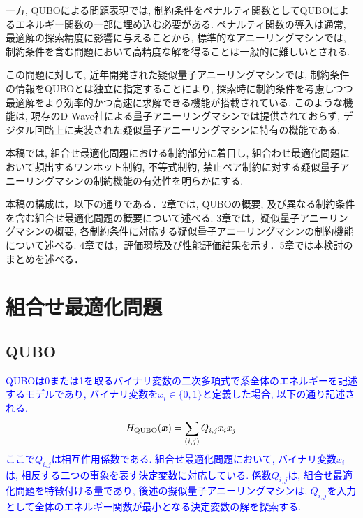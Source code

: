 \documentclass[submit,techrep,noauthor]{ipsj}
\begin{document}
一方, QUBOによる問題表現では, 制約条件をペナルティ関数としてQUBOによるエネルギー関数の一部に埋め込む必要がある. ペナルティ関数の導入は通常, 最適解の探索精度に影響に与えることから, 標準的なアニーリングマシンでは, 制約条件を含む問題において高精度な解を得ることは一般的に難しいとされる\cite{ozeki, onoda2}.

この問題に対して, 近年開発された疑似量子アニーリングマシンでは, 制約条件の情報をQUBOとは独立に指定することにより, 探索時に制約条件を考慮しつつ最適解をより効率的かつ高速に求解できる機能が搭載されている\cite{takano, da3}. このような機能は, 現存のD-Wave社による量子アニーリングマシンでは提供されておらず, デジタル回路上に実装された疑似量子アニーリングマシンに特有の機能である. 

本稿では, 組合せ最適化問題における制約部分に着目し, 組合わせ最適化問題において頻出するワンホット制約, 不等式制約, 禁止ペア制約に対する疑似量子アニーリングマシンの制約機能の有効性を明らかにする.

本稿の構成は，以下の通りである．2章では, QUBOの概要, 及び異なる制約条件を含む組合せ最適化問題の概要について述べる. 3章では，疑似量子アニーリングマシンの概要, 各制約条件に対応する疑似量子アニーリングマシンの制約機能について述べる. 4章では，評価環境及び性能評価結果を示す．5章では本検討のまとめを述べる．

\section{組合せ最適化問題}

\subsection{QUBO}
\textcolor{blue}{QUBOは0または1を取るバイナリ変数の二次多項式で系全体のエネルギーを記述するモデルであり, バイナリ変数を$x_{i}\in\{0, 1\}$と定義した場合, 以下の通り記述される.
\begin{equation}
H_{\rm{QUBO}}(\bm{x}) = \sum_{(i,j)} Q_{i,j}x_{i}x_{j}
\label{H_qubo}
\end{equation}
ここで$Q_{i,j}$は相互作用係数である. 組合せ最適化問題において, バイナリ変数$x_{i}$は, 相反する二つの事象を表す決定変数に対応している. 係数$Q_{i,j}$は, 組合せ最適化問題を特徴付ける量であり, 後述の擬似量子アニーリングマシンは, $Q_{i,j}$を入力として全体のエネルギー関数が最小となる決定変数の解を探索する. }
\end{document}
